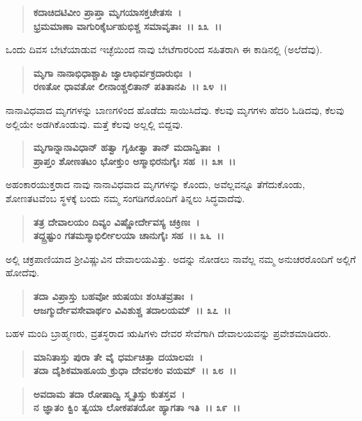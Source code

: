 \begin{verse}
\textbf{ಕದಾಚಿದಟಿವೀಂ ಪ್ರಾಪ್ತಾ ಮೃಗಯಾಸಕ್ತಚೇತಸಃ~।}\\\textbf{ಭ್ರಮಮಾಣಾ ವಾಗುರಿಕೈರ್ಬಹುಭಿಶ್ಚ ಸಮಾವೃತಾಃ~।। ೩೩~।।} 
\end{verse}

ಒಂದು ದಿವಸ ಬೇಟೆಯಾಡುವ ಇಚ್ಛೆಯಿಂದ ನಾವು ಬೇಟೆಗಾರರಿಂದ ಸಹಿತರಾಗಿ ಈ ಕಾಡಿನಲ್ಲಿ (ಅಲೆದೆವು).

\begin{verse}
\textbf{ಮೃಗಾ ನಾನಾಭಿಧಾಶ್ಚಾಪಿ ಜ್ವಾಲಾಭಿರ್ವಕ್ರದಾರುಭಿಃ~।}\\\textbf{ರಣತೋ ಧಾವತೋ ಲೀನಾಂಶ್ಚಲಿತಾನ್ ಪತಿತಾನಪಿ~।। ೩೪~।। }
\end{verse}

ನಾನಾವಿಧವಾದ ಮೃಗಗಳನ್ನು ಬಾಣಗಳಿಂದ ಹೊಡೆದು ಸಾಯಿಸಿದೆವು. ಕೆಲವು ಮೃಗಗಳು ಹೆದರಿ ಓಡಿದವು, ಕೆಲವು ಅಲ್ಲಿಯೇ ಅಡಗಿಕೊಂಡುವು. ಮತ್ತೆ ಕೆಲವು ಅಲ್ಲಲ್ಲಿ ಬಿದ್ದವು.

\begin{verse}
\textbf{ಮೃಗಾನ್ನಾನಾವಿಧಾನ್ ಹತ್ವಾ ಗೃಹೀತ್ವಾ ತಾನ್ ಮದಾನ್ವಿತಾಃ~।}\\\textbf{ಪ್ರಾಪ್ತಂ ಶೋಣತಟಂ ಭೋಕ್ತುಂ ಅಸ್ಮಾಭಿರನುಗೈಃ ಸಹ~।। ೩೫~।।} 
\end{verse}

ಅಹಂಕಾರಯುಕ್ತರಾದ ನಾವು ನಾನಾವಿಧವಾದ ಮೃಗಗಳನ್ನು ಕೊಂದು, ಅವೆಲ್ಲವನ್ನೂ ತೆಗೆದುಕೊಂಡು, ಶೋಣತಟವೆಂಬ ಸ್ಥಳಕ್ಕೆ ಬಂದು ನಮ್ಮ ಸಂಗಡಿಗರೊಂದಿಗೆ ತಿನ್ನಲು ಸಿದ್ಧ\-ವಾದೆವು.

\begin{verse}
\textbf{ತತ್ರ ದೇವಾಲಯಂ ದಿವ್ಯಂ ವಿಷ್ಣೋರ್ದೇವಸ್ಯ ಚಕ್ರಿಣಃ~।}\\\textbf{ತದ್ದ್ರಷ್ಟುಂ ಗತಮಸ್ಮಾಭಿರ್ಲೀಲಯಾ ಚಾನುಗೈಃ ಸಹ~।। ೩೬~।। }
\end{verse}

ಅಲ್ಲಿ ಚಕ್ರಪಾಣಿಯಾದ ಶ‍್ರೀವಿಷ್ಣುವಿನ ದೇವಾಲಯವಿತ್ತು. ಅದನ್ನು ನೋಡಲು ನಾವೆಲ್ಲ ನಮ್ಮ ಅನುಚರರೊಂದಿಗೆ ಅಲ್ಲಿಗೆ ಹೋದೆವು.

\begin{verse}
\textbf{ತದಾ ವಿಪ್ರಾಸ್ತು ಬಹವೋ ಋಷಯಃ ಶಂಸಿತವ್ರತಾಃ~।}\\\textbf{ಆಜಗ್ಮುರ್ದೇವಸೇವಾರ್ಥಂ ವಿವಿಶುಶ್ಚ ತದಾಲಯಮ್~।। ೩೭~।। }
\end{verse}

ಬಹಳ ಮಂದಿ ಬ್ರಾಹ್ಮಣರು, ವ್ರತಸ್ಥರಾದ ಋಷಿಗಳು ದೇವರ ಸೇವೆಗಾಗಿ ದೇವಾಲಯವನ್ನು ಪ್ರವೇಶಮಾಡಿದರು.

\begin{verse}
\textbf{ಮಾನಿತಾಸ್ತು ಪುರಾ ತೇ ವೈ ಧರ್ಮಚಿತ್ತಾ ದಯಾಲವಃ~।}\\\textbf{ತದಾ ದೈಶಿಕಮಾಹೂಯ ಕ್ರುಧಾ ದೇವಲಕಂ ವಯಮ್~।। ೩೮~।। }
\end{verse}

\begin{verse}
\textbf{ಅವದಾಮ ತದಾ ರೋಷಾದ್ವಿ ಸ್ಮೃತಿಸ್ತು ಕುತಸ್ತವ~।}\\\textbf{ನ ಜ್ಞಾತಂ ಕ್ವಿಂ ತ್ವಯಾ ಲೋಕಪತಯೋ ಹ್ಯಾಗತಾ ಇತಿ~।। ೩೯~।। }
\end{verse}

